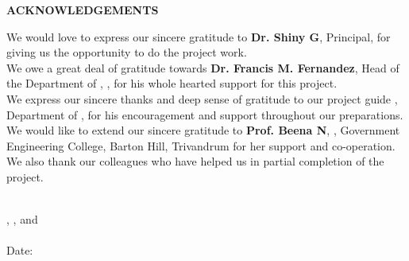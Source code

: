 \thispagestyle{plain}
\begin{center}
 \Large {\bf \uppercase{Acknowledgements}}
\end{center}
\vspace{3\baselineskip}
\justifying
%
%
%
We would love to express our sincere gratitude to 
{\bf Dr. Shiny G}, Principal,
\University for giving us the opportunity to do the project
work.
\\
 We owe a great deal of gratitude towards {\bf Dr. Francis M. Fernandez}, Head of the Department of \Department, \University, for his whole
hearted support for this project.
\\
 We express our sincere thanks and deep sense of gratitude
to our project guide {\bf \Supervisor}, Department of \Department, for his encouragement and support throughout our preparations.
\\
We would like to extend our sincere gratitude to {\bf Prof. Beena N}, \Department, Government Engineering College, Barton Hill, Trivandrum for her support and
co-operation.
\\
We also thank our colleagues who have helped us in partial completion of the project.

\centering
\noindent
\vspace{\baselineskip} \\
\textbf{\firstAuthor}, \textbf{\secondAuthor}, \textbf{\thirdAuthor} and \textbf{\fourthAuthor}\\
\University \\
Date: \reportSubmissionDate